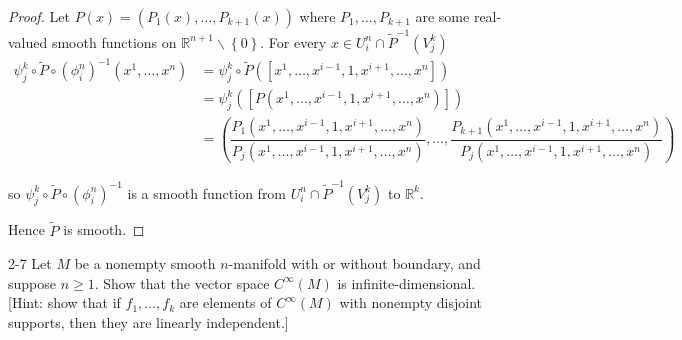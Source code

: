 \begin{proof}
    Let \( P(x) = (P_{1}(x), \ldots, P_{k+1}(x)) \) where \( P_{1}, \ldots, P_{k+1} \) are some real-valued smooth functions on \( \mathbb{R}^{n+1} \smallsetminus \left\{ 0 \right\} \). For every \( x \in U_{i}^{n} \cap \widetilde{P}^{-1}(V_{j}^{k}) \)
    \begingroup
    \allowdisplaybreaks%
    \begin{align*}
        \psi_{j}^{k} \circ \widetilde{P} \circ {(\phi_{i}^{n})}^{-1}(x^{1}, \ldots, x^{n}) & = \psi_{j}^{k} \circ \widetilde{P}([x^{1}, \ldots, x^{i-1}, 1, x^{i+1}, \ldots, x^{n}])                                                                                                                                                                                           \\
                                                                                           & = \psi_{j}^{k}([P(x^{1}, \ldots, x^{i-1}, 1, x^{i+1}, \ldots, x^{n})])                                                                                                                                                                                                            \\
                                                                                           & = \left( \dfrac{P_{1}(x^{1}, \ldots, x^{i-1}, 1, x^{i+1}, \ldots, x^{n})}{P_{j}(x^{1}, \ldots, x^{i-1}, 1, x^{i+1}, \ldots, x^{n})}, \ldots, \dfrac{P_{k+1}(x^{1}, \ldots, x^{i-1}, 1, x^{i+1}, \ldots, x^{n})}{P_{j}(x^{1}, \ldots, x^{i-1}, 1, x^{i+1}, \ldots, x^{n})} \right)
    \end{align*}
    \endgroup

    so \( \psi_{j}^{k} \circ \widetilde{P} \circ {(\phi_{i}^{n})}^{-1} \) is a smooth function from \( U_{i}^{n} \cap \widetilde{P}^{-1}(V_{j}^{k}) \) to \( \mathbb{R}^{k} \).

    Hence \( \widetilde{P} \) is smooth.
\end{proof}

\begin{problem}{2-7}
    Let \( M \) be a nonempty smooth \(n\)-manifold with or without boundary, and suppose \( n \ge 1 \). Show that the vector space \( C^{\infty}(M) \) is infinite-dimensional. [Hint: show that if \( f_{1}, \ldots, f_{k} \) are elements of \( C^{\infty}(M) \) with nonempty disjoint supports, then they are linearly independent.]
\end{problem}

